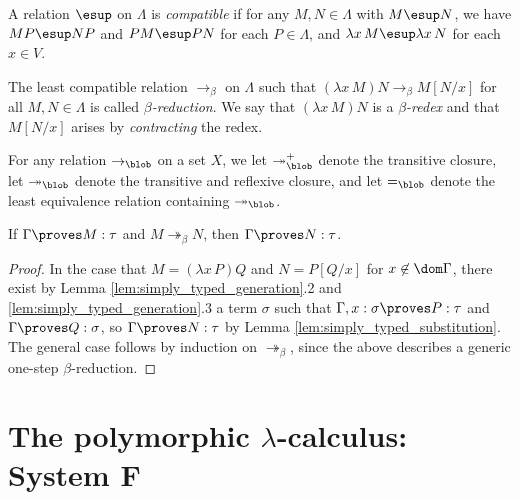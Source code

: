 \documentclass[reqno]{amsart}
\begin{document}
    \begin{definition}
        A relation $\esup$ on $\Lambda$ is \textit{compatible} if for any $M,N\in\Lambda$ with $M\esup N$, we have $MP\esup NP$ and $PM\esup PN$ for each $P\in\Lambda$, and $\lambda x\,M\esup\lambda x\,N$ for each $x\in V$.
    \end{definition}

    \begin{definition}
        The least compatible relation $\rightarrow_\beta$ on $\Lambda$ such that $(\lambda x\,M)N\rightarrow_\beta M[N/x]$ for all $M,N\in\Lambda$ is called \textit{$\beta$-reduction}. We say that $(\lambda x\,M)N$ is a \textit{$\beta$-redex} and that $M[N/x]$ arises by \textit{contracting} the redex.
    \end{definition}

    \begin{notation}
        For any relation $\rightarrow_\blob$ on a set $X$, we let $\twoheadrightarrow_\blob^+$ denote the transitive closure, let $\twoheadrightarrow_\blob$ denote the transitive and reflexive closure, and let $=_\blob$ denote the least equivalence relation containing $\twoheadrightarrow_\blob$.
    \end{notation}

    \begin{theorem}
        If $\Gamma\proves M:\tau$ and $M\twoheadrightarrow_\beta N$, then $\Gamma\proves N:\tau$.
    \end{theorem}
    \begin{proof}
        In the case that $M=(\lambda x\,P)Q$ and $N=P[Q/x]$ for $x\not\in\dom\Gamma$, there exist by Lemma \ref{lem:simply_typed_generation}.2 and \ref{lem:simply_typed_generation}.3 a term $\sigma$ such that $\Gamma,x:\sigma\proves P:\tau$ and $\Gamma\proves Q:\sigma$, so $\Gamma\proves N:\tau$ by Lemma \ref{lem:simply_typed_substitution}. The general case follows by induction on $\twoheadrightarrow_\beta$, since the above describes a generic one-step $\beta$-reduction.
    \end{proof}

    \section{The polymorphic $\lambda$-calculus: System $\mathbf{F}$}

    \begin{definition}
        
    \end{definition}
\end{document}
